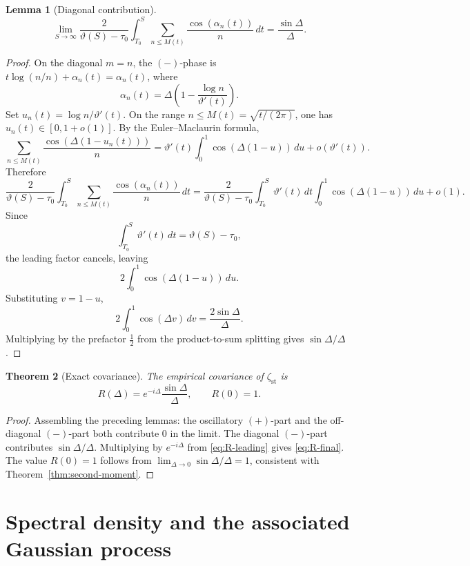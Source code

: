 \documentclass[11pt]{article}
\numberwithin{equation}{section}
\theoremstyle{plain}
\newtheorem{theorem}{Theorem}[section]
\newtheorem{lemma}[theorem]{Lemma}
\theoremstyle{definition}
\begin{document}
\begin{lemma}[Diagonal contribution]
\[
\lim_{S\to\infty}
\frac{2}{\vartheta(S)-\tau_0}
\int_{T_0}^S
\sum_{n\le M(t)}
\frac{\cos(\alpha_n(t))}{n}
\,dt
=
\frac{\sin\Delta}{\Delta}.
\]
\end{lemma}

\begin{proof}
On the diagonal \(m=n\), the \((-)\)-phase is \(t\log(n/n)+\alpha_n(t)=\alpha_n(t)\),
where
\[
\alpha_n(t)=\Delta\!\left(1-\frac{\log n}{\vartheta'(t)}\right).
\]
Set \(u_n(t)=\log n/\vartheta'(t)\). On the range \(n\le M(t)=\sqrt{t/(2\pi)}\), one
has \(u_n(t)\in[0,1+o(1)]\). By the Euler--Maclaurin formula,
\[
\sum_{n\le M(t)}\frac{\cos(\Delta(1-u_n(t)))}{n}
=\vartheta'(t)\int_0^1\cos(\Delta(1-u))\,du+o(\vartheta'(t)).
\]
Therefore
\[
\frac{2}{\vartheta(S)-\tau_0}
\int_{T_0}^S
\sum_{n\le M(t)}\frac{\cos(\alpha_n(t))}{n}\,dt
=
\frac{2}{\vartheta(S)-\tau_0}
\int_{T_0}^S
\vartheta'(t)\,dt\int_0^1\cos(\Delta(1-u))\,du
+o(1).
\]
Since
\[
\int_{T_0}^S\vartheta'(t)\,dt=\vartheta(S)-\tau_0,
\]
the leading factor cancels, leaving
\[
2\int_0^1\cos(\Delta(1-u))\,du.
\]
Substituting \(v=1-u\),
\[
2\int_0^1\cos(\Delta v)\,dv=\frac{2\sin\Delta}{\Delta}.
\]
Multiplying by the prefactor \(\frac12\) from the product-to-sum splitting gives
\(\sin\Delta/\Delta\).
\end{proof}

\begin{theorem}[Exact covariance]
\label{thm:covariance}
The empirical covariance of \(\zeta_{\mathrm{st}}\) is
\begin{equation}
R(\Delta)=e^{-i\Delta}\frac{\sin\Delta}{\Delta},
\qquad
R(0)=1.
\label{eq:R-final}
\end{equation}
\end{theorem}

\begin{proof}
Assembling the preceding lemmas: the oscillatory \((+)\)-part and the off-diagonal
\((-)\)-part both contribute \(0\) in the limit. The diagonal \((-)\)-part contributes
\(\sin\Delta/\Delta\). Multiplying by \(e^{-i\Delta}\) from \eqref{eq:R-leading} gives
\eqref{eq:R-final}. The value \(R(0)=1\) follows from
\(\lim_{\Delta\to0}\sin\Delta/\Delta=1\), consistent with Theorem~\ref{thm:second-moment}.
\end{proof}

\section{Spectral density and the associated Gaussian process}
\end{document}
